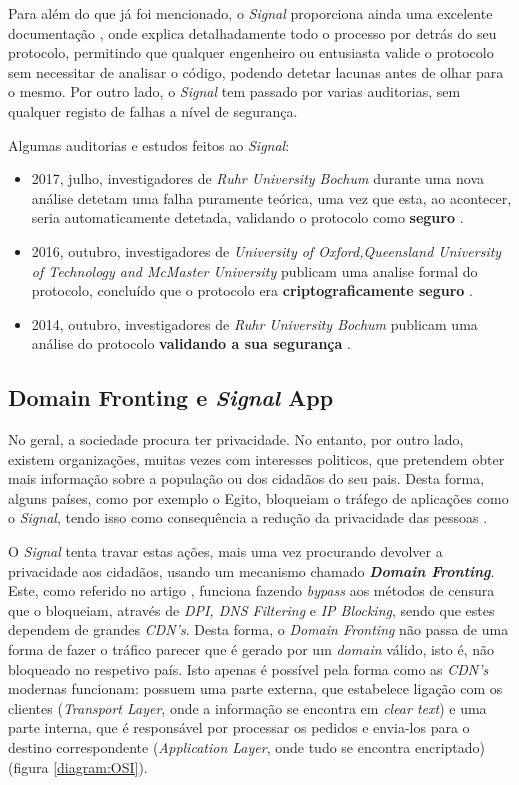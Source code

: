 Para além do que já foi mencionado, o \textit{Signal} proporciona ainda uma excelente documentação \cite{signal}, onde explica detalhadamente todo o processo por detrás do seu protocolo, permitindo que qualquer engenheiro ou entusiasta valide o protocolo sem necessitar de analisar o código, podendo detetar lacunas antes de olhar para o mesmo. Por outro lado, o \textit{Signal} tem passado por varias auditorias, sem qualquer registo de falhas a nível de segurança.

Algumas auditorias e estudos feitos ao \textit{Signal}:
\begin{itemize}
    \item 2017, julho, investigadores de \textit{Ruhr University Bochum} durante uma nova análise detetam uma falha puramente teórica, uma vez que esta, ao acontecer, seria automaticamente detetada, validando o protocolo como \textbf{seguro} \cite{rosler2018more}.
    
    \item 2016, outubro, investigadores de \textit{University of Oxford,Queensland University of Technology and McMaster University} publicam uma analise formal do protocolo, concluído que o protocolo era \textbf{criptograficamente seguro} \cite{cohn2017formal}.

    \item 2014, outubro, investigadores de \textit{Ruhr University Bochum} publicam uma análise do protocolo \textbf{validando a sua segurança} \cite{frosch2016secure}.
\end{itemize}


\subsection{Domain Fronting e \textit{Signal} App}
No geral, a sociedade procura ter privacidade. No entanto, por outro lado, existem organizações, muitas vezes com interesses politicos, que pretendem obter mais informação sobre a população ou dos cidadãos do seu pais. Desta forma, alguns países, como por exemplo o Egito, bloqueiam o tráfego de aplicações como o \textit{Signal}, tendo isso como consequência a redução da privacidade das pessoas \cite{noSignal}.

O \textit{Signal} tenta travar estas ações, mais uma vez procurando devolver a privacidade aos cidadãos, usando um mecanismo chamado \textbf{\textit{Domain Fronting}}. Este, como referido no artigo \cite{domainFrontingExplained}, funciona fazendo \textit{bypass} aos métodos de censura que o bloqueiam, através de \textit{DPI, DNS Filtering} e \textit{IP Blocking}, sendo que estes dependem de grandes \textit{CDN's}. Desta forma, o \textit{Domain Fronting} não passa de uma forma de fazer o tráfico parecer que é gerado por um \textit{domain} válido, isto é, não bloqueado no respetivo país. Isto apenas é possível pela forma como as \textit{CDN's} modernas funcionam: possuem uma parte externa, que estabelece ligação com os clientes (\textit{Transport Layer}, onde a informação se encontra em \textit{clear text}) e uma parte interna, que é responsável por processar os pedidos e envia-los para o destino correspondente (\textit{Application Layer}, onde tudo se encontra encriptado) (figura \ref{diagram:OSI}).


